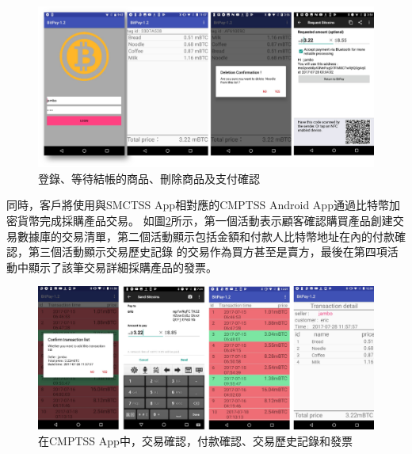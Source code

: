 \begin{figure}[htbp]
	\centering
	\includegraphics[width = 1\textwidth]{fig7.png}
	\caption{登錄、等待結帳的商品、刪除商品及支付確認}\label{fig7}
\end{figure}

同時，客戶將使用與SMCTSS App相對應的CMPTSS Android App通過比特幣加密貨幣完成採購產品交易。 如圖\ref{fig8}所示，第一個活動表示顧客確認購買產品創建交易數據庫的交易清單，第二個活動顯示包括金額和付款人比特幣地址在內的付款確認，第三個活動顯示交易歷史記錄 的交易作為買方甚至是賣方，最後在第四項活動中顯示了該筆交易詳細採購產品的發票。    

\begin{figure}[htbp]
	\centering
	\includegraphics[width = 1\textwidth]{fig8.png}
	\caption{在CMPTSS App中，交易確認，付款確認、交易歷史記錄和發票}\label{fig8}
\end{figure}